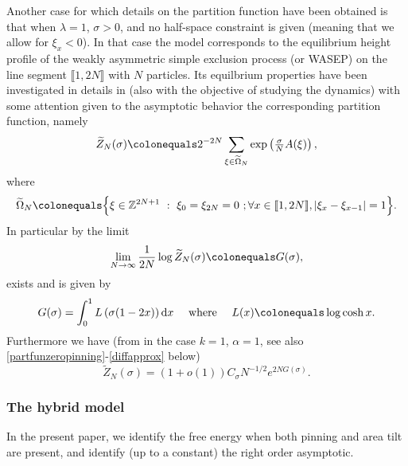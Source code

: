 \documentclass[reqno,11pt]{amsart}
\numberwithin{equation}{section}
\newcommand{\gl}{\lambda}
\newcommand{\lint}{\llbracket}
\newcommand{\rint}{\rrbracket}
\newcommand{\dd}{\mathrm{d}}
\renewcommand{\tilde}{\widetilde}
\begin{document}
Another case for which details on the partition function have been obtained 
is that when $\gl=1$, $\sigma>0$, and no half-space constraint is given (meaning that we allow for $\xi_x<0$).
 In that case the model corresponds to the equilibrium height profile of the weakly asymmetric simple exclusion process (or WASEP) on the line segment $\lint 1, 2N \rint$ with $N$ particles. Its equilbrium properties have been investigated in details in  \cite[Section 2]{LabbeWABridge} (also with the objective of studying the dynamics) with some attention given to the asymptotic behavior the  corresponding partition function, namely 
 \begin{equation}\label{partitilde}
  \tilde Z_N(\sigma)\colonequals 2^{-2N} \sum_{\xi \in \tilde\Omega_N} \exp\left(\tfrac{\sigma}{N} A(\xi)\right),
\end{equation}
 where 
\begin{equation}
\widetilde{\Omega}_N\colonequals \Big\{\xi\in \mathbb{Z}^{2N+1} \ : \   \xi_0=\xi_{2N}=0 \ ;  \forall x \in \lint 1, 2N \rint, \vert \xi_{x}-\xi_{x-1}\vert=1  \Big\} \label{wsepspace}.
\end{equation}
In particular by  \cite[Proposition 3]{LabbeWABridge} the limit
\begin{equation*}
\lim_{N \to \infty} \frac{1}{2N} \log \tilde Z_N(\sigma)\colonequals  G(\sigma),
\end{equation*}
 exists and  is given by
\begin{equation}
G(\sigma)=\int_0^1 L\left(\sigma(1-2x)\right) \dd x   \quad  \text{ where }  \quad L(x)\colonequals\log \cosh x. \label{functiong}
\end{equation}
Furthermore we have  (from \cite[Lemma 11]{LabbeWABridge} in the case $k=1$, $\alpha=1$, see also \eqref{partfunzeropinning}-\eqref{diffapprox} below) 
\begin{equation}\label{asymparea}
 \tilde Z_N(\sigma)=(1+o(1))C_{\sigma} N^{-1/2}e^{2N G(\sigma)}.
\end{equation}


\subsubsection{The hybrid model}
In the present paper, we identify the free energy  when both pinning and area tilt are present, and identify (up to a constant) the right order  asymptotic.
\end{document}

